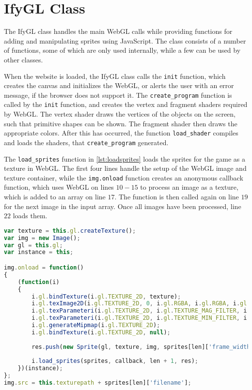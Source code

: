 \section{IfyGL Class}
\label{sec:ifygl_class}

The IfyGL class handles the main WebGL calls while providing functions for adding and manipulating sprites using JavaScript.
The class consists of a number of functions, some of which are only used internally, while a few can be used by other classes.\newline

When the website is loaded, the IfyGL class calls the \texttt{init} function, which creates the canvas and initializes the WebGL, or alerts the user with an error message, if the browser does not support it.
The \texttt{create\_program} function is called by the \texttt{init} function, and creates the vertex and fragment shaders required by WebGL.
The vertex shader draws the vertices of the objects on the screen, such that primitive shapes can be shown.
The fragment shader then draws the appropriate colors.
After this has occurred, the function \texttt{load\_shader} compiles and loads the shaders, that \texttt{create\_program} generated.\newline

The \texttt{load\_sprites} function in \autoref{lst:loadsprites} loads the sprites for the game as a texture in WebGL.
The first four lines handle the setup of the WebGL image and texture container, while the \texttt{img.onload} function creates an anonymous callback function, which uses WebGL on lines $10-15$ to process an image as a texture, which is added to an array on line $17$.
The function is then called again on line $19$ for the next image in the input array.
Once all images have been processed, line $22$ loads them.

\begin{lstlisting}[language=JavaScript, caption=The function \texttt{load\_sprites}, label=lst:loadsprites]
var texture = this.gl.createTexture();
var img = new Image();
var gl = this.gl;
var instance = this;

img.onload = function()
{
	(function(i)
	{
		i.gl.bindTexture(i.gl.TEXTURE_2D, texture);
		i.gl.texImage2D(i.gl.TEXTURE_2D, 0, i.gl.RGBA, i.gl.RGBA, i.gl.UNSIGNED_BYTE, img);
		i.gl.texParameteri(i.gl.TEXTURE_2D, i.gl.TEXTURE_MAG_FILTER, i.gl.LINEAR);
		i.gl.texParameteri(i.gl.TEXTURE_2D, i.gl.TEXTURE_MIN_FILTER, i.gl.LINEAR_MIPMAP_NEAREST);
		i.gl.generateMipmap(i.gl.TEXTURE_2D);
		i.gl.bindTexture(i.gl.TEXTURE_2D, null);
		
		res.push(new Sprite(gl, texture, img, sprites[len]['frame_width'], sprites[len]['frame_height'], sprites[len]['origin']));
		
		i.load_sprites(sprites, callback, len + 1, res);
	})(instance);
};
img.src = this.texturepath + sprites[len]['filename'];
\end{lstlisting}

